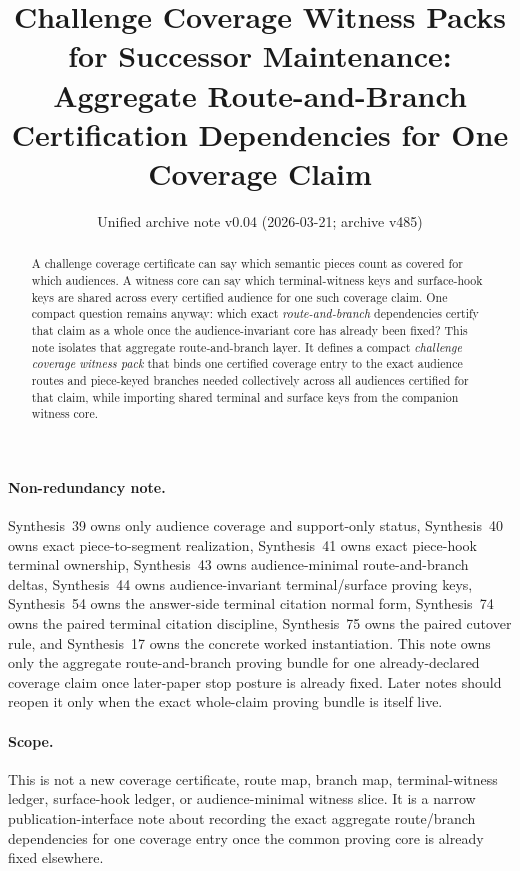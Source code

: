 \documentclass[11pt]{article}
\title{Challenge Coverage Witness Packs for Successor Maintenance:\\[0.5ex]
\large Aggregate Route-and-Branch Certification Dependencies for One Coverage Claim}
\author{}
\date{Unified archive note v0.04 (2026-03-21; archive v485)}
\begin{document}
\maketitle

\begin{abstract}
A challenge coverage certificate can say which semantic pieces count as covered for which audiences.
A witness core can say which terminal-witness keys and surface-hook keys are shared across every certified audience for one such coverage claim.
One compact question remains anyway: which exact \emph{route-and-branch} dependencies certify that claim as a whole once the audience-invariant core has already been fixed?
This note isolates that aggregate route-and-branch layer.
It defines a compact \emph{challenge coverage witness pack} that binds one certified coverage entry to the exact audience routes and piece-keyed branches needed collectively across all audiences certified for that claim, while importing shared terminal and surface keys from the companion witness core.
\end{abstract}

\paragraph{Non-redundancy note.}
Synthesis~39 owns only audience coverage and support-only status, Synthesis~40 owns exact piece-to-segment realization, Synthesis~41 owns exact piece-hook terminal ownership, Synthesis~43 owns audience-minimal route-and-branch deltas, Synthesis~44 owns audience-invariant terminal/surface proving keys, Synthesis~54 owns the answer-side terminal citation normal form, Synthesis~74 owns the paired terminal citation discipline, Synthesis~75 owns the paired cutover rule, and Synthesis~17 owns the concrete worked instantiation.
This note owns only the aggregate route-and-branch proving bundle for one already-declared coverage claim once later-paper stop posture is already fixed. Later notes should reopen it only when the exact whole-claim proving bundle is itself live.
\paragraph{Scope.}
This is not a new coverage certificate, route map, branch map, terminal-witness ledger, surface-hook ledger, or audience-minimal witness slice.
It is a narrow publication-interface note about recording the exact aggregate route/branch dependencies for one coverage entry once the common proving core is already fixed elsewhere.
\end{document}

